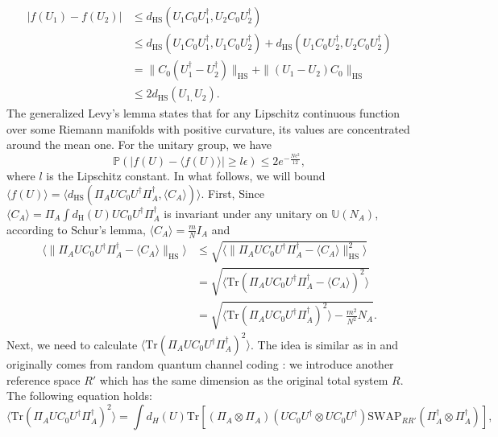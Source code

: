 \documentclass[aps,onecolumn,nofootinbib,superscriptaddress,notitlepage,longbibliography]{revtex4-1}
\def \Tr {\mathrm{Tr}}
\begin{document}
\begin{align*}
|f(U_{1})-f(U_{2})| & \leq d_{\mathrm{HS}}(U_{1}C_{0}U_{1}^{\dagger},U_{2}C_{0}U_{2}^{\dagger})\\
 & \leq d_{\mathrm{HS}}(U_{1}C_{0}U_{1}^{\dagger},U_{1}C_{0}U_{2}^{\dagger}) +d_{\mathrm{HS}}(U_{1}C_{0}U_{2}^{\dagger},U_{2}C_{0}U_{2}^{\dagger})\\
 & =\|C_{0}(U_{1}^{\dagger}-U_{2}^{\dagger})\|_{\mathrm{HS}}+\|(U_{1}-U_{2})C_{0}\|_{\mathrm{HS}}\\
 & \leq2d_{\mathrm{HS}}(U_{1,}U_{2}).
\end{align*}
The generalized Levy's lemma \citep{measure_concentration1,measure_concentration2,Meckes2019}
states that for any Lipschitz continuous function over some Riemann
manifolds with positive curvature, its values are concentrated around
the mean one. For the unitary group, %
we have 
\begin{equation}
\mathbb{P}(|f(U)-\langle f(U)\rangle|\geq l\epsilon)\leq2e^{-\frac{N\epsilon^{2}}{12}},
\end{equation}
where $l$ is the Lipschitz constant. In what follows, we will bound $\langle f(U)\rangle=\langle d_{\mathrm{HS}}(\Pi_{A}UC_{0}U^{\dagger}\Pi_{A}^{\dagger},\langle C_{A}\rangle)\rangle$.
First, Since $\langle C_{A}\rangle=\Pi_{A}\int d_{\mathrm{H}}(U)UC_{0}U^{\dagger}\Pi_{A}^{\dagger}$
is invariant under any unitary on $\mathbb{U}(N_A)$, %
according to Schur's lemma, $\langle C_{A}\rangle=\frac{m}{N}I_{A}$
and
\begin{align*}
\langle\|\Pi_{A}UC_{0}U^{\dagger}\Pi_{A}^{\dagger}-\langle C_{A}\rangle\|_{\mathrm{HS}}\rangle & \leq\sqrt{\langle\|\Pi_{A}UC_{0}U^{\dagger}\Pi_{A}^{\dagger}-\langle C_{A}\rangle\|_{\mathrm{HS}}^{2}\rangle}\\
 & =\sqrt{\langle\mathrm{Tr}(\Pi_{A}UC_{0}U^{\dagger}\Pi_{A}^{\dagger}-\langle C_{A}\rangle)^{2}\rangle}\\
 & =\sqrt{\langle\mathrm{Tr}(\Pi_{A}UC_{0}U^{\dagger}\Pi_{A}^{\dagger})^{2}\rangle-\frac{m^{2}}{N^{2}}N_{A}}.
\end{align*}
Next, we need to calculate $\langle\Tr(\Pi_{A}UC_{0}U^{\dagger}\Pi_{A}^{\dagger})^{2}\rangle$.
The idea is similar as in \citep{Popescu2006} and originally comes
from random quantum channel coding \citep{PhysRevA.55.1613}: we introduce
another reference space $R'$ which has the same dimension as the
original total system $R$. The following equation holds:
\[
\langle\mathrm{Tr}(\Pi_{A}UC_{0}U^{\dagger}\Pi_{A}^{\dagger})^{2}\rangle=\int d_{H}(U)\mathrm{Tr}[(\Pi_{A}\otimes\Pi_{A})(UC_{0}U^{\dagger}\otimes UC_{0}U^{\dagger})\mathrm{SWAP}_{RR'}(\Pi_{A}^{\dagger}\otimes\Pi_{A}^{\dagger})],
\]
\end{document}
